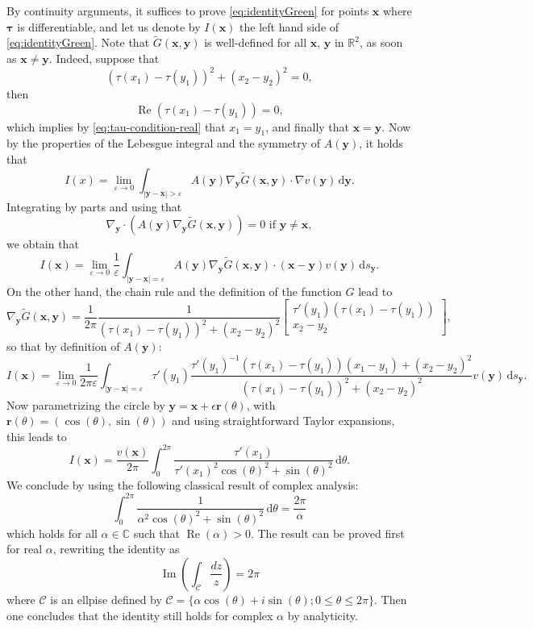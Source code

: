 \documentclass[review,hidelinks,onefignum,onetabnum]{siamart220329}
\newcommand{\R}{\mathbb{R}}
\newcommand{\C}{\mathbb{C}}
\newcommand{\bx}{\mathbf{x}}
\newcommand{\btau}{\boldsymbol{\tau}}
\newcommand{\by}{\mathbf{y}}
\newcommand{\br}{\boldsymbol{r}}
\newcommand{\de}{\,\mathrm{d}}
\newcommand{\real}{\operatorname{Re}}
\newcommand{\imag}{\operatorname{Im}}
\begin{document}
By continuity arguments, it suffices to prove \eqref{eq:identityGreen} for points $\bx$ where $\btau$ is differentiable, and let us denote by $I(\bx)$ the left hand side of \eqref{eq:identityGreen}. Note that  $\widetilde{G}(\bx,\by)$ is well-defined for all $\bx$, $\by$ in $\R^2$, as soon as $\bx\neq\by$. Indeed, suppose that 
$$(\tau(x_1)-\tau(y_1))^2+(x_2-y_2)^2=0,$$
then 
$$\real (\tau(x_1)-\tau(y_1))=0,$$
which implies by \eqref{eq:tau-condition-real} that $x_1=y_1$, and finally that $\bx=\by$. 
Now by the
 properties of the Lebesgue integral and the symmetry of $A(\by)$, it holds that
 $$I(x)=\lim_{\varepsilon\to 0}\int_{|\by-\bx|>\varepsilon}  A(\by)\nabla_\by\widetilde{G}(\bx,\by) \cdot  \nabla v(\by)    \de \by.$$
 Integrating by parts and using that 
 $$\nabla_{\by} \cdot( A({\by}) \nabla_\by\widetilde{G}(\bx,\by))=0\mbox{ if }\by\neq \bx,$$
 we obtain that
 $$I(\bx)=\lim_{\varepsilon\to 0}\frac{1}{\varepsilon}\int_{|\by-\bx|=\varepsilon}A({\by}) \nabla_\by\widetilde{G}(\bx,\by)\cdot (\bx-\by)v(\by)    \de s_\by.$$
 On the other hand, the chain rule and the definition of the function $G$ lead to 
 $$\nabla_\by\widetilde{G}(\bx,\by)=\frac{1}{2\pi }\frac{1}{(\tau(x_1)-\tau(y_1))^2+(x_2-y_2)^2}\begin{bmatrix}
  \tau'(y_1)(\tau(x_1)-\tau(y_1))  \\
    x_2-y_2 
 \end{bmatrix},$$
 so that by definition of $A(\by)$:
  $$I(\bx)=\lim_{\varepsilon\to 0}\frac{1}{2\pi\varepsilon}\int_{|\by-\bx|=\varepsilon}\tau'(y_1)\frac{ \tau'(y_1)^{-1}(\tau(x_1)-\tau(y_1))(x_1-y_1) +(x_2-y_2)^2}{(\tau(x_1)-\tau(y_1))^2+(x_2-y_2)^2}v(\by)  \de s_\by.$$
  Now parametrizing the circle by $\by = \bx + \epsilon\br(\theta)$, with
 $\br(\theta) = (\cos(\theta),\sin(\theta))$ and using straightforward Taylor expansions, this leads to 
 $$I(\bx)=\frac{v(\bx)}{2\pi}\int_0^{2\pi} \frac{\tau'(x_1)}{\tau'(x_1)^2\cos(\theta)^2+\sin(\theta)^2} \de \theta.$$
We conclude by using the following classical result of complex analysis: 
$$\int_0^{2\pi} \frac{1}{\alpha^2\cos(\theta)^2+\sin(\theta)^2} \de \theta=\frac{2\pi}{\alpha}$$
which holds for all $\alpha\in\C$ such that $\real(\alpha)>0$. The result can be proved first for real $\alpha$, rewriting the identity as
$$\imag \left(\int_{\mathcal C}\frac{dz}{z}\right)=2\pi$$
where ${\mathcal C}$ is an ellpise defined by  ${\mathcal C}=\{\alpha\cos(\theta)+i\sin(\theta); 0\leq\theta\leq 2\pi\}$. Then one concludes that the identity still holds for complex $\alpha$ by analyticity. 
\end{document}
